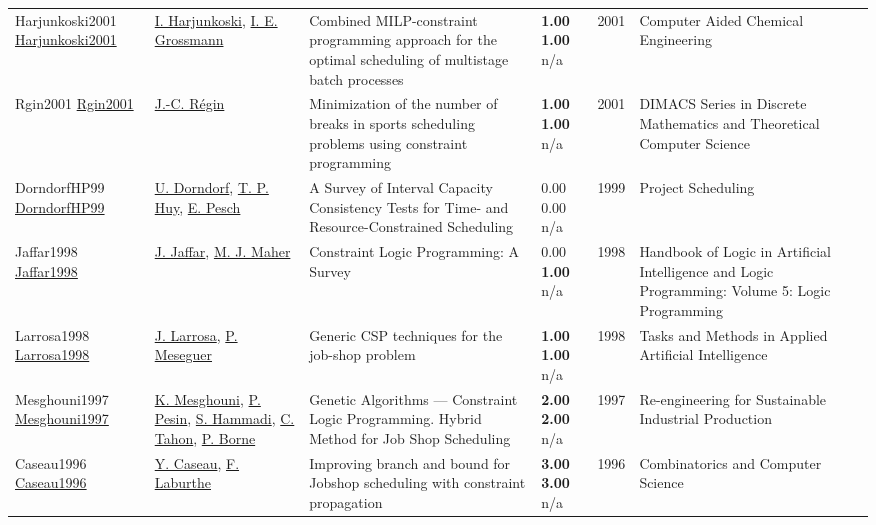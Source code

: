{\begin{longtable}{p{3cm}p{5cm}p{10cm}p{1cm}rp{2.5cm}l}
Harjunkoski2001 \href{http://dx.doi.org/10.1016/s1570-7946(01)80140-1}{Harjunkoski2001} & \hyperref[auth:a870]{I. Harjunkoski}, \hyperref[auth:a382]{I. E. Grossmann} & Combined MILP-constraint programming approach for the optimal scheduling of multistage batch processes & \noindent{}\textbf{1.00} \textbf{1.00} n/a & 2001 & Computer Aided Chemical Engineering & \cite{Harjunkoski2001}\\
Rgin2001 \href{http://dx.doi.org/10.1090/dimacs/057/07}{Rgin2001} & \hyperref[auth:a1419]{J.-C. Régin} & Minimization of the number of breaks in sports scheduling problems using constraint programming & \noindent{}\textbf{1.00} \textbf{1.00} n/a & 2001 & DIMACS Series in Discrete Mathematics and Theoretical Computer Science & \cite{Rgin2001}\\
DorndorfHP99 \href{http://dx.doi.org/10.1007/978-1-4615-5533-9_10}{DorndorfHP99} & \hyperref[auth:a903]{U. Dorndorf}, \hyperref[auth:a904]{T. P. Huy}, \hyperref[auth:a437]{E. Pesch} & A Survey of Interval Capacity Consistency Tests for Time- and Resource-Constrained Scheduling & \noindent{}\textcolor{black!50}{0.00} \textcolor{black!50}{0.00} n/a & 1999 & Project Scheduling & \cite{DorndorfHP99}\\
Jaffar1998 \href{http://dx.doi.org/10.1093/oso/9780198537922.003.0012}{Jaffar1998} & \hyperref[auth:a1066]{J. Jaffar}, \hyperref[auth:a1067]{M. J. Maher} & Constraint Logic Programming: A Survey & \noindent{}\textcolor{black!50}{0.00} \textbf{1.00} n/a & 1998 & Handbook of Logic in Artificial Intelligence and Logic Programming: Volume 5: Logic Programming & \cite{Jaffar1998}\\
Larrosa1998 \href{http://dx.doi.org/10.1007/3-540-64574-8_390}{Larrosa1998} & \hyperref[auth:a1791]{J. Larrosa}, \hyperref[auth:a1792]{P. Meseguer} & \cellcolor{green!10}Generic CSP techniques for the job-shop problem & \noindent{}\textbf{1.00} \textbf{1.00} n/a & 1998 & Tasks and Methods in Applied Artificial Intelligence & \cite{Larrosa1998}\\
Mesghouni1997 \href{http://dx.doi.org/10.1007/978-0-387-35086-8_12}{Mesghouni1997} & \hyperref[auth:a1906]{K. Mesghouni}, \hyperref[auth:a1457]{P. Pesin}, \hyperref[auth:a1907]{S. Hammadi}, \hyperref[auth:a1458]{C. Tahon}, \hyperref[auth:a1908]{P. Borne} & Genetic Algorithms — Constraint Logic Programming. Hybrid Method for Job Shop Scheduling & \noindent{}\textbf{2.00} \textbf{2.00} n/a & 1997 & Re-engineering for Sustainable Industrial Production & \cite{Mesghouni1997}\\
Caseau1996 \href{http://dx.doi.org/10.1007/3-540-61576-8_79}{Caseau1996} & \hyperref[auth:a301]{Y. Caseau}, \hyperref[auth:a1511]{F. Laburthe} & Improving branch and bound for Jobshop scheduling with constraint propagation & \noindent{}\textbf{3.00} \textbf{3.00} n/a & 1996 & Combinatorics and Computer Science & \cite{Caseau1996}\\

\end{longtable}}
